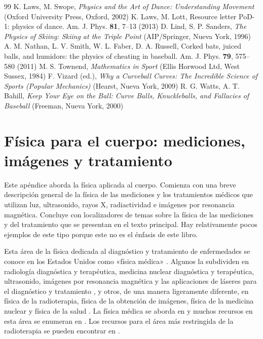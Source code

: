 \documentclass[12pt,a4paper]{book}
\begin{document}
\begin{thebibliography}{99}
 K. Laws, M. Swope, \emph{Physics and the Art of Dance: Understanding Movement} (Oxford University Press, Oxford, 2002)
 K. Laws, M. Lott, Resource letter PoD-1: physics of dance. Am. J. Phys. \textbf{81}, 7--13 (2013)
 D. Lind, S. P. Sanders, \emph{The Physics of Skiing: Skiing at the Triple Point} (AIP/Springer, Nueva York, 1996)
 A. M. Nathan, L. V. Smith, W. L. Faber, D. A. Russell, Corked bats, juiced balls, and humidors: the physics of cheating in baseball. Am. J. Phys. \textbf{79}, 575--580 (2011)
 M. S. Townend, \emph{Mathematics in Sport} (Ellis Horwood Ltd, West Sussex, 1984)
 F. Vizard (ed.), \emph{Why a Curveball Curves: The Incredible Science of Sports (Popular Mechanics)} (Hearst, Nueva York, 2009)
 R. G. Watts, A. T. Bahill, \emph{Keep Your Eye on the Ball: Curve Balls, Knuckleballs, and Fallacies of Baseball} (Freeman, Nueva York, 2000)
\end{thebibliography}


\chapter[Mediciones, Imágenes y Tratamiento]{Física para el cuerpo: mediciones, imágenes y tratamiento}\label{ch:appendixH}

Este apéndice aborda la física aplicada al cuerpo. Comienza con una breve descripción general de la física de las mediciones y los tratamientos médicos que utilizan luz, ultrasonido, rayos X, radiactividad e imágenes por resonancia magnética. Concluye con localizadores de temas sobre la física de las mediciones y del tratamiento que se presentan en el texto principal. Hay relativamente pocos ejemplos de este tipo porque este no es el énfasis de este libro.

Esta área de la física dedicada al diagnóstico y tratamiento de enfermedades se conoce en los Estados Unidos como «física médica» \cite{H2}. Algunos la subdividen en radiología diagnóstica y terapéutica, medicina nuclear diagnóstica y terapéutica, ultrasonido, imágenes por resonancia magnética y las aplicaciones de láseres para el diagnóstico y tratamiento \cite{H2}, y otros, de una manera ligeramente diferente, en física de la radioterapia, física de la obtención de imágenes, física de la medicina nuclear y física de la salud \cite{H4}. La física médica se aborda en \cite{H3} y muchos recursos en esta área se enumeran en \cite{H1, H2}. Los recursos para el área más restringida de la radioterapia se pueden encontrar en \cite{H4}.
\end{document}
